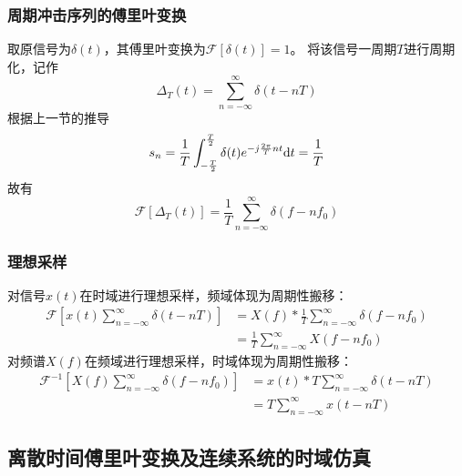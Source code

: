     \subsubsection{周期冲击序列的傅里叶变换}
        取原信号为$\delta(t)$，其傅里叶变换为$\mathscr{F}[\delta(t)]=1$。
        将该信号一周期$T$进行周期化，记作
        \begin{equation}
            \Delta_T(t)=\sum_{n=-\infty}^{\infty}\delta(t-nT)
        \end{equation}
        根据上一节的推导
        \begin{equation*}
            s_n=\frac{1}{T}\int_{-\frac{T}{2}}^{\frac{T}{2}}\delta(t)e^{-j\frac{2\pi}{T}nt}\text{\upshape d} t =\frac{1}{T}
        \end{equation*}
        故有
        \begin{equation}
            \mathscr{F}[\Delta_T(t)]=\frac{1}{T}\sum_{n=-\infty}^{\infty}\delta(f-nf_0)
        \end{equation}
    
    \subsubsection{理想采样}
        对信号$x(t)$在时域进行理想采样，频域体现为周期性搬移：
        \begin{equation}\label{eq:FourierofDelta}
            \begin{split}
                \mathscr{F}[x(t)\sum_{n=-\infty}^{\infty}\delta(t-nT)]&= X(f)*\frac{1}{T}\sum_{n=-\infty}^{\infty}\delta(f-nf_0)\\
                                                                      &= \frac{1}{T}\sum_{n=-\infty}^{\infty}X(f-nf_0)
            \end{split}
        \end{equation}
        对频谱$X(f)$在频域进行理想采样，时域体现为周期性搬移：
        \begin{equation}
            \begin{split}
                \mathscr{F}^{-1}[X(f)\sum_{n=-\infty}^{\infty}\delta(f-nf_0)] &= x(t)*T\sum_{n=-\infty}^{\infty}\delta(t-nT)\\
                                                                              &= T\sum_{n=-\infty}^{\infty}x(t-nT)
            \end{split}
        \end{equation}

\subsection{离散时间傅里叶变换及连续系统的时域仿真}
